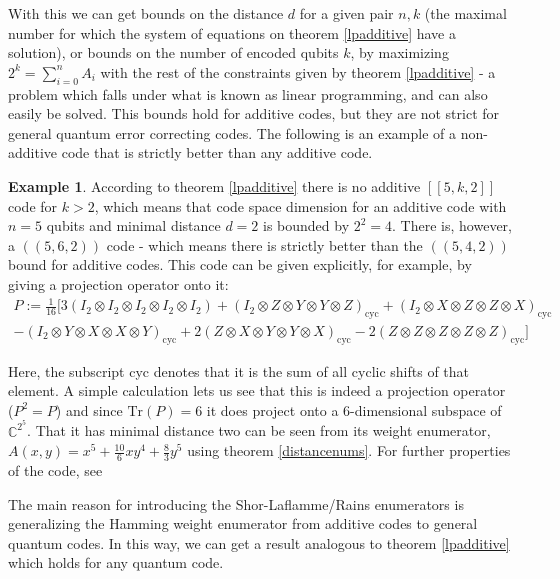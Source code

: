 \documentclass{article}
\def\C{\mathbb{C}}
\def\Tr{\text{Tr}}
\theoremstyle{definition}
\newtheorem{ex}[Satz]{Example}
\begin{document}
With this we can get bounds on the distance $d$ for a given pair $n,k$ (the maximal number for which the system of equations on theorem \ref{lpadditive} have a solution), or bounds on the number of encoded qubits $k$, 
by maximizing $2^k = \sum_{i=0}^n A_i$ with the rest of the constraints given by theorem \ref{lpadditive} - a problem which falls under what is known as linear programming, and can also easily be solved.
This bounds hold for additive codes, but they are not strict for general quantum error correcting codes. The following is an example of a non-additive code that is strictly better than any additive code.

\begin{ex}
According to theorem \ref{lpadditive} there is no additive $[[5,k,2]]$ code for $k > 2$, which means that 
code space dimension for an additive code with $n=5$ qubits and minimal distance $d=2$ is bounded by $2^2 = 4$.
There is, however, a $((5,6,2))$ code - which means there is strictly better than the $((5,4,2))$ bound for additive codes. 
This code can be given explicitly, for example, by giving a projection operator onto it:
\begin{align*}
  P:= \frac{1}{16} [ 3 (I_2 \otimes I_2 \otimes I_2 \otimes I_2 \otimes I_2) + (I_2 \otimes Z \otimes Y \otimes Y \otimes Z)_\text{cyc} +  (I_2 \otimes X \otimes Z \otimes Z \otimes X)_\text{cyc} \\
-  (I_2 \otimes Y \otimes X \otimes X \otimes Y)_\text{cyc} + 2  (Z \otimes X \otimes Y \otimes Y \otimes X)_\text{cyc} - 2 (Z \otimes Z \otimes Z \otimes Z \otimes Z)_\text{cyc}]
\end{align*}

Here, the subscript cyc denotes that it is the sum of all cyclic shifts of that element. A simple calculation lets us see that this is indeed a projection operator ($P^2 = P$) and since $\Tr(P) = 6$ it does project onto a $6$-dimensional subspace of $\C^{2^5}$.
That it has minimal distance two can be seen from its weight enumerator, $A(x,y) =  x^5 + \frac{10}{6} xy^4 + \frac{8}{3} y^5$ using theorem \ref{distancenums}. For further properties of the code, see \cite{nonadditive}
\end{ex}

The main reason for introducing the Shor-Laflamme/Rains enumerators is generalizing the Hamming weight enumerator from additive codes to general quantum codes. In this way, we can get a result analogous to theorem \ref{lpadditive} which holds for any quantum code. 
\end{document}
